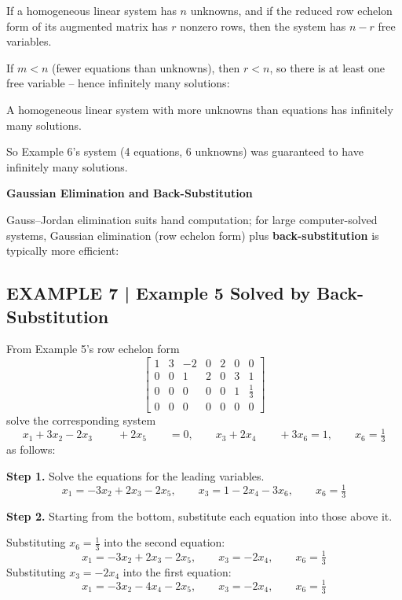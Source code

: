 \documentclass{article}
\newcommand{\redheading}[1]{{\vspace{2mm}\noindent\Large\bfseries\color{red!55!black} #1\par}\vspace{2mm}}
\theoremstyle{mystyle}
\begin{document}
\begin{tcolorbox}[colback=red!4, colframe=red!60!black, title=Theorem 1.2.1 -- Free Variable Theorem for Homogeneous Systems, boxrule=0.5mm, arc=3mm]
If a homogeneous linear system has $n$ unknowns, and if the reduced row echelon form of its augmented matrix has $r$ nonzero rows, then the system has $n-r$ free variables.
\end{tcolorbox}

If $m<n$ (fewer equations than unknowns), then $r<n$, so there is at least one free variable -- hence infinitely many solutions:

\begin{tcolorbox}[colback=red!4, colframe=red!60!black, title=Theorem 1.2.2, boxrule=0.5mm, arc=3mm]
A homogeneous linear system with more unknowns than equations has infinitely many solutions.
\end{tcolorbox}

So Example 6's system (4 equations, 6 unknowns) was guaranteed to have infinitely many solutions.

\redheading{Gaussian Elimination and Back-Substitution}

Gauss--Jordan elimination suits hand computation; for large computer-solved systems, Gaussian elimination (row echelon form) plus \textbf{back-substitution} is typically more efficient:

\subsection*{EXAMPLE 7 | Example 5 Solved by Back-Substitution}
From Example 5's row echelon form
\[
\begin{bmatrix}1&3&-2&0&2&0&0\\0&0&1&2&0&3&1\\0&0&0&0&0&1&\tfrac13\\0&0&0&0&0&0&0\end{bmatrix}
\]
solve the corresponding system
\[
x_1+3x_2-2x_3\qquad\ +2x_5\qquad=0,\qquad x_3+2x_4\qquad+3x_6=1,\qquad x_6=\tfrac13
\]
as follows:

\noindent\textbf{Step 1.} Solve the equations for the leading variables.
\[
x_1=-3x_2+2x_3-2x_5,\qquad x_3=1-2x_4-3x_6,\qquad x_6=\tfrac13
\]

\noindent\textbf{Step 2.} Starting from the bottom, substitute each equation into those above it.

Substituting $x_6=\tfrac13$ into the second equation:
\[
x_1=-3x_2+2x_3-2x_5,\qquad x_3=-2x_4,\qquad x_6=\tfrac13
\]
Substituting $x_3=-2x_4$ into the first equation:
\[
x_1=-3x_2-4x_4-2x_5,\qquad x_3=-2x_4,\qquad x_6=\tfrac13
\]
\end{document}
